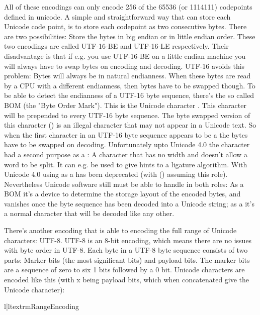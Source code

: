 All of these encodings can only encode 256 of the 65536 (or 1114111)
codepoints defined in unicode. A simple and straightforward way that
can store each Unicode code point, is to store each codepoint as two
consecutive bytes. There are two possibilities: Store the bytes in big
endian or in little endian order. These two encodings are called
UTF-16-BE and UTF-16-LE respectively. Their disadvantage is that if
e.g. you use UTF-16-BE on a little endian machine you will always have
to swap bytes on encoding and decoding. UTF-16 avoids this problem:
Bytes will always be in natural endianness. When these bytes are read
by a CPU with a different endianness, then bytes have to be swapped
though. To be able to detect the endianness of a UTF-16 byte sequence,
there's the so called BOM (the "Byte Order Mark"). This is the Unicode
character . This character will be prepended to every UTF-16
byte sequence. The byte swapped version of this character () is
an illegal character that may not appear in a Unicode text. So when
the first character in an UTF-16 byte sequence appears to be a 
the bytes have to be swapped on decoding. Unfortunately upto Unicode
4.0 the character  had a second purpose as a : A character that has no width and doesn't allow a
word to be split. It can e.g. be used to give hints to a ligature
algorithm. With Unicode 4.0 using  as a  has been deprecated (with  () assuming
this role). Nevertheless Unicode software still must be able to handle
 in both roles: As a BOM it's a device to determine the storage
layout of the encoded bytes, and vanishes once the byte sequence has
been decoded into a Unicode string; as a 
it's a normal character that will be decoded like any other.

There's another encoding that is able to encoding the full range of
Unicode characters: UTF-8. UTF-8 is an 8-bit encoding, which means
there are no issues with byte order in UTF-8. Each byte in a UTF-8
byte sequence consists of two parts: Marker bits (the most significant
bits) and payload bits. The marker bits are a sequence of zero to six
1 bits followed by a 0 bit. Unicode characters are encoded like this
(with x being payload bits, which when concatenated give the Unicode
character):

\begin{tableii}{l|l}{textrm}{Range}{Encoding}
\end{tableii}

